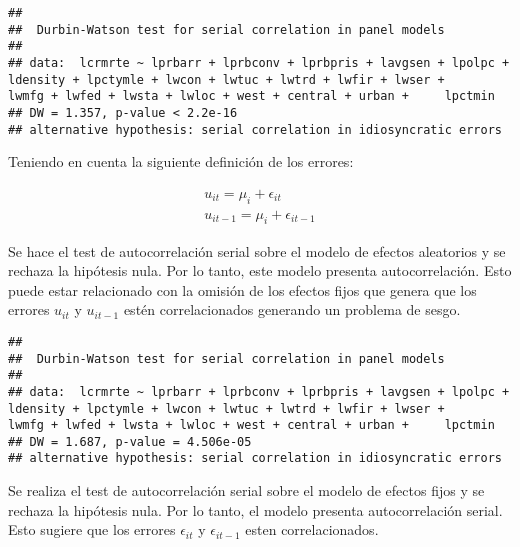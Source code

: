 \documentclass[
]{article}
\begin{document}
\begin{verbatim}
## 
##  Durbin-Watson test for serial correlation in panel models
## 
## data:  lcrmrte ~ lprbarr + lprbconv + lprbpris + lavgsen + lpolpc +     ldensity + lpctymle + lwcon + lwtuc + lwtrd + lwfir + lwser +     lwmfg + lwfed + lwsta + lwloc + west + central + urban +     lpctmin
## DW = 1.357, p-value < 2.2e-16
## alternative hypothesis: serial correlation in idiosyncratic errors
\end{verbatim}

Teniendo en cuenta la siguiente definición de los errores:

\begin{gather*}
u_{it} = \mu_i+ \epsilon_{it} \\
u_{it-1} = \mu_i+ \epsilon_{it-1}
\end{gather*}

Se hace el test de autocorrelación serial sobre el modelo de efectos
aleatorios y se rechaza la hipótesis nula. Por lo tanto, este modelo
presenta autocorrelación. Esto puede estar relacionado con la omisión de
los efectos fijos que genera que los errores \(u_{it}\) y \(u_{it-1}\)
estén correlacionados generando un problema de sesgo.

\begin{verbatim}
## 
##  Durbin-Watson test for serial correlation in panel models
## 
## data:  lcrmrte ~ lprbarr + lprbconv + lprbpris + lavgsen + lpolpc +     ldensity + lpctymle + lwcon + lwtuc + lwtrd + lwfir + lwser +     lwmfg + lwfed + lwsta + lwloc + west + central + urban +     lpctmin
## DW = 1.687, p-value = 4.506e-05
## alternative hypothesis: serial correlation in idiosyncratic errors
\end{verbatim}

Se realiza el test de autocorrelación serial sobre el modelo de efectos
fijos y se rechaza la hipótesis nula. Por lo tanto, el modelo presenta
autocorrelación serial. Esto sugiere que los errores \(\epsilon_{it}\) y
\(\epsilon_{it-1}\) esten correlacionados.
\end{document}

